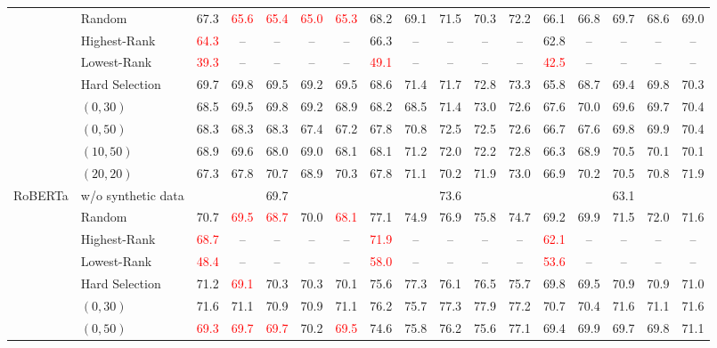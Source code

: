 \begin{table}[t]
\begin{tabular}{llccccccccccccccc}
 & Random & 67.3 & \textcolor{red}{65.6} & \textcolor{red}{65.4} & \textcolor{red}{65.0} & \textcolor{red}{65.3} & 68.2 & 69.1 & 71.5 & 70.3 & 72.2 & 66.1 & 66.8 & 69.7 & 68.6 & 69.0 \\
 & Highest-Rank & \textcolor{red}{64.3} & -- & -- & -- & -- & 66.3 & -- & -- & -- & -- & 62.8 & -- & -- & -- & -- \\
 & Lowest-Rank & \textcolor{red}{39.3} & -- & -- & -- & -- & \textcolor{red}{49.1} & -- & -- & -- & -- & \textcolor{red}{42.5} & -- & -- & -- & -- \\
 & Hard Selection & 69.7 & 69.8 & 69.5 & 69.2 & 69.5 & 68.6 & 71.4 & 71.7 & 72.8 & 73.3 & 65.8 & 68.7 & 69.4 & 69.8 & 70.3 \\
 & $(0, 30)$ & 68.5 & 69.5 & 69.8 & 69.2 & 68.9 & 68.2 & 68.5 & 71.4 & 73.0 & 72.6 & 67.6 & 70.0 & 69.6 & 69.7 & 70.4 \\
 & $(0, 50)$ & 68.3 & 68.3 & 68.3 & 67.4 & 67.2 & 67.8 & 70.8 & 72.5 & 72.5 & 72.6 & 66.7 & 67.6 & 69.8 & 69.9 & 70.4 \\
 & $(10, 50)$ & 68.9 & 69.6 & 68.0 & 69.0 & 68.1 & 68.1 & 71.2 & 72.0 & 72.2 & 72.8 & 66.3 & 68.9 & 70.5 & 70.1 & 70.1 \\
 & $(20, 20)$ & 67.3 & 67.8 & 70.7 & 68.9 & 70.3 & 67.8 & 71.1 & 70.2 & 71.9 & 73.0 & 66.9 & 70.2 & 70.5 & 70.8 & 71.9 \\
\midrule
\multirow{9}{*}{RoBERTa} & w/o synthetic data & \multicolumn{5}{c}{69.7} & \multicolumn{5}{c}{73.6} & \multicolumn{5}{c}{63.1} \\
 & Random & 70.7 & \textcolor{red}{69.5} & \textcolor{red}{68.7} & 70.0 & \textcolor{red}{68.1} & 77.1 & 74.9 & 76.9 & 75.8 & 74.7 & 69.2 & 69.9 & 71.5 & 72.0 & 71.6 \\
 & Highest-Rank & \textcolor{red}{68.7} & -- & -- & -- & -- & \textcolor{red}{71.9} & -- & -- & -- & -- & \textcolor{red}{62.1} & -- & -- & -- & -- \\
 & Lowest-Rank & \textcolor{red}{48.4} & -- & -- & -- & -- & \textcolor{red}{58.0} & -- & -- & -- & -- & \textcolor{red}{53.6} & -- & -- & -- & -- \\
 & Hard Selection & 71.2 & \textcolor{red}{69.1} & 70.3 & 70.3 & 70.1 & 75.6 & 77.3 & 76.1 & 76.5 & 75.7 & 69.8 & 69.5 & 70.9 & 70.9 & 71.0 \\
 & $(0, 30)$ & 71.6 & 71.1 & 70.9 & 70.9 & 71.1 & 76.2 & 75.7 & 77.3 & 77.9 & 77.2 & 70.7 & 70.4 & 71.6 & 71.1 & 71.6 \\
 & $(0, 50)$ & \textcolor{red}{69.3} & \textcolor{red}{69.7} & \textcolor{red}{69.7} & 70.2 & \textcolor{red}{69.5} & 74.6 & 75.8 & 76.2 & 75.6 & 77.1 & 69.4 & 69.9 & 69.7 & 69.8 & 71.1 \\

\end{tabular}
\end{table}
